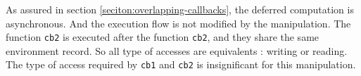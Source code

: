 As assured in section \ref{seciton:overlapping-callbacks}, the deferred computation is asynchronous.
And the execution flow is not modified by the manipulation.
The function \texttt{cb2} is executed after the function \texttt{cb2}, and they share the same environment record.
So all type of accesses are equivalents : writing or reading.
The type of access required by \texttt{cb1} and \texttt{cb2} is insignificant for this manipulation.




























